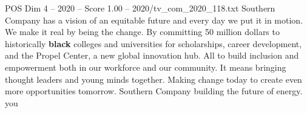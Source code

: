 \begin{textsample}{POS Dim 4 – 2020 – Score 1.00 – 2020/tv\_com\_2020\_118.txt}  \label{ex:f4_pos_043}
Southern Company has a vision of an equitable future and every day we put it in motion.
We make it real by being the change.
By committing 50 million dollars to historically \textbf{black} colleges and universities for scholarships, career development, and the Propel Center, a new global innovation hub.
All to build inclusion and empowerment both in our workforce and our community.
It means bringing thought leaders and young minds together.
Making change today to create even more opportunities tomorrow.
Southern Company building the future of energy. you

\end{textsample}
